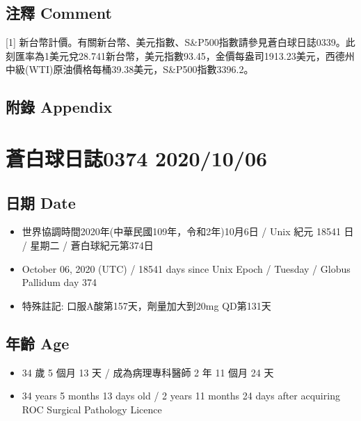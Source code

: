 \documentclass[
]{article}
\providecommand{\tightlist}{%
  \setlength{\itemsep}{0pt}\setlength{\parskip}{0pt}}
\begin{document}
\hypertarget{ux6ce8ux91cb-comment-32}{%
\subsection{注釋 Comment}\label{ux6ce8ux91cb-comment-32}}

{[}1{]}
新台幣計價。有關新台幣、美元指數、S\&P500指數請參見蒼白球日誌0339。此刻匯率為1美元兌28.741新台幣，美元指數93.45，金價每盎司1913.23美元，西德州中級(WTI)原油價格每桶39.38美元，S\&P500指數3396.2。

\hypertarget{ux9644ux9304-appendix-32}{%
\subsection{附錄 Appendix}\label{ux9644ux9304-appendix-32}}

\hypertarget{ux84bcux767dux7403ux65e5ux8a8c0374-20201006}{%
\section{蒼白球日誌0374
2020/10/06}\label{ux84bcux767dux7403ux65e5ux8a8c0374-20201006}}

\hypertarget{ux65e5ux671f-date-33}{%
\subsection{日期 Date}\label{ux65e5ux671f-date-33}}

\begin{itemize}
\tightlist
\item
  世界協調時間2020年(中華民國109年，令和2年)10月6日 / Unix 紀元 18541 日
  / 星期二 / 蒼白球紀元第374日
\item
  October 06, 2020 (UTC) / 18541 days since Unix Epoch / Tuesday /
  Globus Pallidum day 374
\item
  特殊註記: 口服A酸第157天，劑量加大到20mg QD第131天
\end{itemize}

\hypertarget{ux5e74ux9f61-age-33}{%
\subsection{年齡 Age}\label{ux5e74ux9f61-age-33}}

\begin{itemize}
\tightlist
\item
  34 歲 5 個月 13 天 / 成為病理專科醫師 2 年 11 個月 24 天
\item
  34 years 5 months 13 days old / 2 years 11 months 24 days after
  acquiring ROC Surgical Pathology Licence
\end{itemize}
\end{document}
